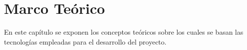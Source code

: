 \chapter{Marco Teórico} \label{chap:Marco Teorico}

En este capítulo se exponen los conceptos teóricos sobre los cuales se basan las tecnologías empleadas para el desarrollo del proyecto.

